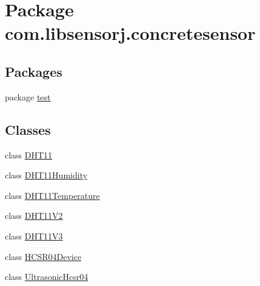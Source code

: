 \hypertarget{namespacecom_1_1libsensorj_1_1concretesensor}{}\section{Package com.\+libsensorj.\+concretesensor}
\label{namespacecom_1_1libsensorj_1_1concretesensor}
\subsection*{Packages}
\begin{DoxyCompactItemize}
\item 
package \hyperlink{namespacecom_1_1libsensorj_1_1concretesensor_1_1test}{test}
\end{DoxyCompactItemize}
\subsection*{Classes}
\begin{DoxyCompactItemize}
\item 
class \hyperlink{classcom_1_1libsensorj_1_1concretesensor_1_1DHT11}{D\+H\+T11}
\item 
class \hyperlink{classcom_1_1libsensorj_1_1concretesensor_1_1DHT11Humidity}{D\+H\+T11\+Humidity}
\item 
class \hyperlink{classcom_1_1libsensorj_1_1concretesensor_1_1DHT11Temperature}{D\+H\+T11\+Temperature}
\item 
class \hyperlink{classcom_1_1libsensorj_1_1concretesensor_1_1DHT11V2}{D\+H\+T11\+V2}
\item 
class \hyperlink{classcom_1_1libsensorj_1_1concretesensor_1_1DHT11V3}{D\+H\+T11\+V3}
\item 
class \hyperlink{classcom_1_1libsensorj_1_1concretesensor_1_1HCSR04Device}{H\+C\+S\+R04\+Device}
\item 
class \hyperlink{classcom_1_1libsensorj_1_1concretesensor_1_1UltrasonicHcsr04}{Ultrasonic\+Hcsr04}
\end{DoxyCompactItemize}
